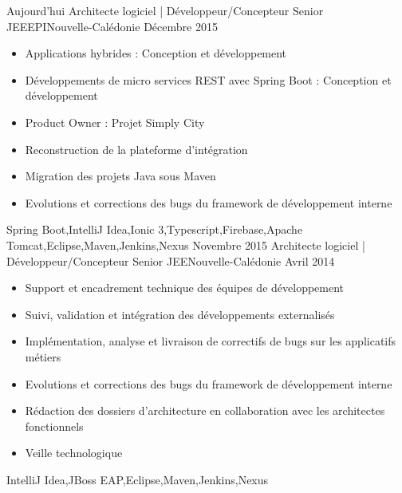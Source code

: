 \documentclass[localFont,alternative,10pt,compact]{yaac-another-awesome-cv}
\begin{document}
	\begin{experiences}
	  \experience
	    {Aujourd'hui}   {Architecte logiciel | Développeur/Concepteur Senior JEE}{EPI}{Nouvelle-Calédonie}
	    {Décembre 2015} {
	                      \begin{itemize}
	                        \item Applications hybrides : Conception et développement
	                        \item Développements de micro services REST avec Spring Boot : Conception et développement
	                        \item Product Owner : Projet Simply City
	                        \item Reconstruction de la plateforme d'intégration
	                        \item Migration des projets Java sous Maven
	                        \item Evolutions et corrections des bugs du framework de développement interne  
	                      \end{itemize}
	                    }
	                    {Spring Boot,IntelliJ Idea,Ionic 3,Typescript,Firebase,Apache Tomcat,Eclipse,Maven,Jenkins,Nexus}
	  \emptySeparator
	  \experience
	    {Novembre 2015} {Architecte logiciel | Développeur/Concepteur Senior JEE}{}{Nouvelle-Calédonie}
	    {Avril 2014}    {
	                      \begin{itemize}
	                        \item Support et encadrement technique des équipes de développement                           
	                        \item Suivi, validation et intégration des développements externalisés                        
	                        \item Implémentation, analyse et livraison de correctifs de bugs sur les applicatifs métiers  
	                        \item Evolutions et corrections des bugs du framework de développement interne                
	                        \item Rédaction des dossiers d'architecture en collaboration avec les architectes fonctionnels
	                        \item Veille technologique                                                                    
	                      \end{itemize}
	                    }
	                    {IntelliJ Idea,JBoss EAP,Eclipse,Maven,Jenkins,Nexus}

\end{experiences}
\end{document}
